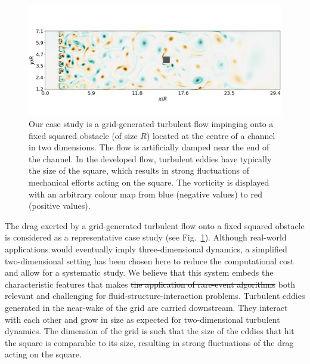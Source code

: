 \documentclass{jfm}
\newcommand{\EL}[1]{{\color{myred}{#1}}}
\begin{document}
\begin{figure}
	\centering
	\includegraphics[width=\linewidth]{illustr_ecoulement/illustr_ecoulement}
	\caption{Our case study is a grid-generated turbulent flow impinging onto a fixed squared obstacle (of size $R$) located at the centre of a channel in two dimensions. The flow is artificially damped near the end of the channel. In the developed flow, turbulent eddies have typically the size of the square, which results in strong fluctuations of mechanical efforts acting on the square. The vorticity is displayed with an arbitrary colour map from blue (negative values) to red (positive values).}
	\label{fig:illustr_ecoulement}
\end{figure}

%
The drag exerted by a grid-generated turbulent flow onto a fixed squared obstacle is considered as a representative case study (see Fig.~\ref{fig:illustr_ecoulement}).
%
Although real-world applications would eventually imply three-dimensional dynamics, a simplified two-dimensional setting has been chosen here to reduce the computational cost and allow for a systematic study.
%
We believe that this system embeds the characteristic features that makes \sout{the application of rare-event algorithms} \EL{this study} both relevant and challenging for fluid-structure-interaction problems.
%
Turbulent eddies generated in the near-wake of the grid are carried downstream.
They interact with each other and grow in size as expected for two-dimensional turbulent dynamics.
The dimension of the grid is such that the size of the eddies that hit the square is comparable to its size, resulting in strong fluctuations of the drag acting on the square.
%
%
%
\end{document}

